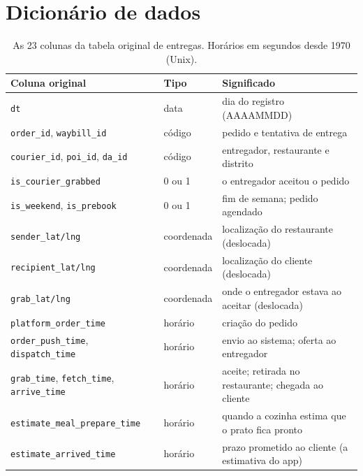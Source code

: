 \documentclass[11pt,a4paper]{article}
\begin{document}
\vspace{0.5em}

\appendix
\section{Dicionário de dados}
\label{sec:dic}

\begin{table}[H]
\centering\footnotesize
\begin{tabularx}{\linewidth}{l l L}
\toprule
Coluna original & Tipo & Significado \\
\midrule
\texttt{dt} & data & dia do registro (AAAAMMDD) \\
\texttt{order\_id}, \texttt{waybill\_id} & código & pedido e tentativa de entrega \\
\texttt{courier\_id}, \texttt{poi\_id}, \texttt{da\_id} & código & entregador, restaurante e distrito \\
\texttt{is\_courier\_grabbed} & 0 ou 1 & o entregador aceitou o pedido \\
\texttt{is\_weekend}, \texttt{is\_prebook} & 0 ou 1 & fim de semana; pedido agendado \\
\texttt{sender\_lat/lng} & coordenada & localização do restaurante (deslocada) \\
\texttt{recipient\_lat/lng} & coordenada & localização do cliente (deslocada) \\
\texttt{grab\_lat/lng} & coordenada & onde o entregador estava ao aceitar (deslocada) \\
\texttt{platform\_order\_time} & horário & criação do pedido \\
\texttt{order\_push\_time}, \texttt{dispatch\_time} & horário & envio ao sistema; oferta ao entregador \\
\texttt{grab\_time}, \texttt{fetch\_time}, \texttt{arrive\_time} & horário & aceite; retirada no restaurante; chegada ao cliente \\
\texttt{estimate\_meal\_prepare\_time} & horário & quando a cozinha estima que o prato fica pronto \\
\texttt{estimate\_arrived\_time} & horário & prazo prometido ao cliente (a estimativa do app) \\
\bottomrule
\end{tabularx}
\caption{As 23 colunas da tabela original de entregas. Horários em segundos desde 1970 (Unix).}
\label{tab:dic-orig}
\end{table}
\end{document}

